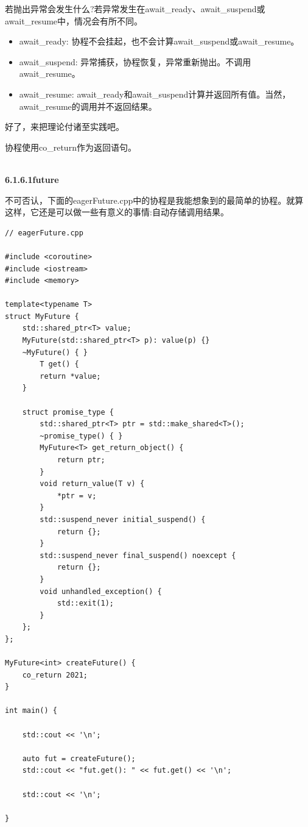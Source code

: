 若抛出异常会发生什么?若异常发生在await\_ready、await\_suspend或await\_resume中，情况会有所不同。

\begin{itemize}
\item 
await\_ready: 协程不会挂起，也不会计算await\_suspend或await\_resume。

\item 
await\_suspend: 异常捕获，协程恢复，异常重新抛出。不调用await\_resume。

\item 
await\_resume: await\_ready和await\_suspend计算并返回所有值。当然，await\_resume的调用并不返回结果。
\end{itemize}

好了，来把理论付诸至实践吧。


协程使用co\_return作为返回语句。

\hspace*{\fill} \\ %
\noindent
\textbf{6.1.6.1\hspace{0.2cm}future}

不可否认，下面的eagerFuture.cpp中的协程是我能想象到的最简单的协程。就算这样，它还是可以做一些有意义的事情:自动存储调用结果。

\begin{lstlisting}[style=styleCXX]
// eagerFuture.cpp

#include <coroutine>
#include <iostream>
#include <memory>

template<typename T>
struct MyFuture {
	std::shared_ptr<T> value;
	MyFuture(std::shared_ptr<T> p): value(p) {}
	~MyFuture() { }
		T get() {
		return *value;
	}

	struct promise_type {
		std::shared_ptr<T> ptr = std::make_shared<T>();
		~promise_type() { }
		MyFuture<T> get_return_object() {
			return ptr;
		}
		void return_value(T v) {
			*ptr = v;
		}
		std::suspend_never initial_suspend() {
			return {};
		}
		std::suspend_never final_suspend() noexcept {
			return {};
		}
		void unhandled_exception() {
			std::exit(1);
		}
	};
};

MyFuture<int> createFuture() {
	co_return 2021;
}

int main() {

	std::cout << '\n';
	
	auto fut = createFuture();
	std::cout << "fut.get(): " << fut.get() << '\n';
	
	std::cout << '\n';

}
\end{lstlisting}


